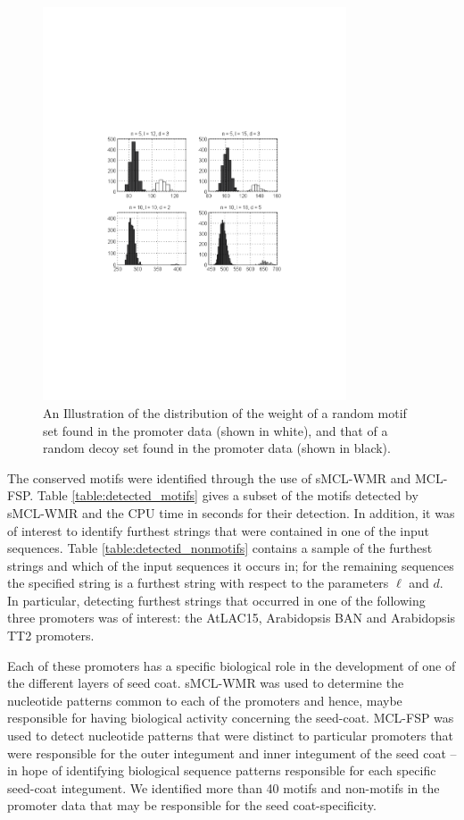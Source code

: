 \begin{figure}[h!]
\centering
\includegraphics[width=90mm,trim=7cm 8cm 7cm 7cm]{images/canola_separation}%
 \caption[An Illustration of the distribution of the weight of a random motif set found in the promoter data, and that of a random decoy set found in the promoter data.]{An Illustration of the distribution of the weight of a random motif set found in the promoter data (shown in white), and that of a random decoy set found in the promoter data (shown in black). }
\label{fig:canola_separation}
\end{figure}


The conserved motifs were identified through the use of sMCL-WMR and MCL-FSP. Table \ref{table:detected_motifs} gives a subset of the motifs detected by sMCL-WMR and the CPU time in seconds for their detection.  In addition, it was of interest to identify furthest strings that were contained in one of the input sequences.  Table \ref{table:detected_nonmotifs} contains a sample of the furthest strings and which of the input sequences it occurs in; for the remaining sequences the specified string is a furthest string with respect to the parameters $\ell$ and $d$.  In particular, detecting furthest strings that occurred in one of the following three promoters was of interest: the AtLAC15, Arabidopsis BAN and Arabidopsis TT2 promoters.  

Each of these promoters has a specific biological role in the development of one of the different layers of seed coat. sMCL-WMR was used to determine the nucleotide patterns common to each of the promoters and hence, maybe responsible for having biological activity concerning the seed-coat. MCL-FSP was used to detect nucleotide patterns that were distinct to particular promoters that were responsible for the outer integument and inner integument of the seed coat -- in hope of identifying biological sequence patterns responsible for each specific seed-coat integument.  We identified more than 40 motifs and non-motifs in the promoter data that may be responsible for the seed coat-specificity. 

